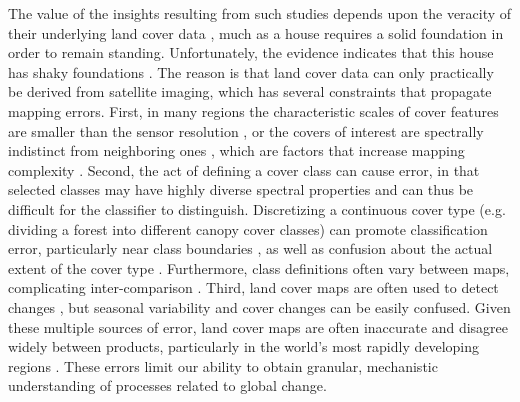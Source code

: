 \documentclass[12 pt, titlepage, a4paper]{article}
\begin{document}
The value of the insights resulting from such studies depends upon the veracity of their underlying land cover data \citep{verburg_challenges_2011}, much as a house requires a solid foundation in order to remain standing. Unfortunately, the evidence indicates that this house has shaky foundations \citep[e.g.][]{fritz_highlighting_2011}. The reason is that land cover data can only practically be derived from satellite imaging, which has several constraints that propagate mapping errors. First, in many regions the characteristic scales of cover features are smaller than the sensor resolution \citep[e.g. smallholders' fields][]{jain_mapping_2013,debats_generalized_2016,ozdogan_resolution_2006}, or the covers of interest are spectrally indistinct from neighboring ones \citep{sweeney_mapping_2015,fritz_identifying_2008}, which are factors that increase mapping complexity \citep{yu_meta-discoveries_2014}. Second, the act of defining a cover class can cause error, in that selected classes may have highly diverse spectral properties \citep[e.g. croplands or savannas;][]{fritz_identifying_2008,verburg_challenges_2011,debats_generalized_2016} and can thus be difficult for the classifier to distinguish. Discretizing a continuous cover type (e.g. dividing a forest into different canopy cover classes) can promote classification error, particularly near class boundaries \citep{foody_status_2002}, as well as confusion about the actual extent of the cover type \citep{sexton_conservation_2015}. Furthermore, class definitions often vary between maps, complicating inter-comparison \citep{kuemmerle_challenges_2013,fritz_identifying_2008}. Third, land cover maps are often used to detect changes \citep[e.g.][]{gross_monitoring_2013}, but seasonal variability and cover changes can be easily confused. Given these multiple sources of error, land cover maps are often inaccurate and disagree widely between products, particularly in the world's most rapidly developing regions \citep{fritz_comparison_2010,fritz_cropland_2011,fritz_need_2013}. These errors limit our ability to obtain granular, mechanistic understanding of processes related to global change. 
\end{document}
